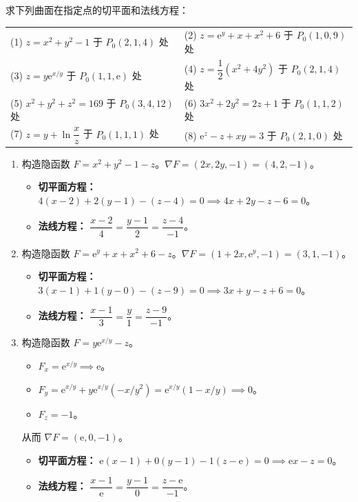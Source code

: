 \documentclass[lang=cn,11pt]{elegantbook}
\begin{document}
\begin{exercise}[综合求切平面和法线方程]
求下列曲面在指定点的切平面和法线方程：\\
\begin{tabular}{p{} p{}}
(1) $z=x^2+y^2-1$ 于 $P_0(2,1,4)$ 处 & (2) $z=\mathrm{e}^y+x+x^2+6$ 于 $P_0(1,0,9)$ 处 \\
(3) $z=y\mathrm{e}^{x/y}$ 于 $P_0(1,1,\mathrm{e})$ 处 & (4) $z=\dfrac{1}{2}(x^2+4y^2)$ 于 $P_0(2,1,4)$ 处 \\
(5) $x^2+y^2+z^2=169$ 于 $P_0(3,4,12)$ 处 & (6) $3x^2+2y^2=2z+1$ 于 $P_0(1,1,2)$ 处 \\
(7) $z=y+\ln\dfrac{x}{z}$ 于 $P_0(1,1,1)$ 处 & (8) $\mathrm{e}^z-z+xy=3$ 于 $P_0(2,1,0)$ 处
\end{tabular}
\end{exercise}
\begin{solution}
\begin{enumerate}
    \item[(1)] 构造隐函数 $F = x^2+y^2-1-z$。$\nabla F = (2x, 2y, -1) = (4, 2, -1)$。
    \begin{itemize}
        \item \textbf{切平面方程：} $4(x-2)+2(y-1)-(z-4)=0 \implies 4x+2y-z-6=0$。
        \item \textbf{法线方程：} $\dfrac{x-2}{4}=\dfrac{y-1}{2}=\dfrac{z-4}{-1}$。
    \end{itemize}
    
    \item[(2)] 构造隐函数 $F = \mathrm{e}^y+x+x^2+6-z$。$\nabla F = (1+2x, \mathrm{e}^y, -1) = (3, 1, -1)$。
    \begin{itemize}
        \item \textbf{切平面方程：} $3(x-1)+1(y-0)-(z-9)=0 \implies 3x+y-z+6=0$。
        \item \textbf{法线方程：} $\dfrac{x-1}{3}=\dfrac{y}{1}=\dfrac{z-9}{-1}$。
    \end{itemize}
    
    \item[(3)] 构造隐函数 $F = y\mathrm{e}^{x/y}-z$。
    \begin{itemize}
        \item $F_x = \mathrm{e}^{x/y} \implies \mathrm{e}$。
        \item $F_y = \mathrm{e}^{x/y} + y\mathrm{e}^{x/y}(-x/y^2) = \mathrm{e}^{x/y}(1-x/y) \implies 0$。
        \item $F_z = -1$。
    \end{itemize}
    从而 $\nabla F = (\mathrm{e}, 0, -1)$。
    \begin{itemize}
        \item \textbf{切平面方程：} $\mathrm{e}(x-1)+0(y-1)-1(z-\mathrm{e})=0 \implies \mathrm{e}x-z=0$。
        \item \textbf{法线方程：} $\dfrac{x-1}{\mathrm{e}}=\dfrac{y-1}{0}=\dfrac{z-\mathrm{e}}{-1}$。
    \end{itemize}
    

\end{enumerate}
\end{solution}
\end{document}
